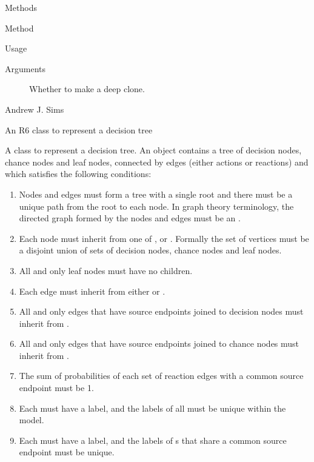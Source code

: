 \documentclass[a4paper]{book}
\begin{document}
\begin{Section}{Methods}
\begin{SubSection}{Method }
\begin{SubSubSection}{Usage}
\end{SubSubSection}


%
\begin{SubSubSection}{Arguments}

\begin{description}

\item[] Whether to make a deep clone.

\end{description}


\end{SubSubSection}

\end{SubSection}

\end{Section}
%
\begin{Author}\relax
Andrew J. Sims 
\end{Author}
%
\begin{Description}\relax
An R6 class to represent a decision tree
\end{Description}
%
\begin{Details}\relax
A class to represent a decision tree. An object contains a tree of
decision nodes, chance nodes and leaf nodes, connected by edges
(either actions or reactions) and which satisfies the following
conditions:
\begin{enumerate}

\item{} Nodes and edges must form a tree with a single root and
there must be a unique path from the root to each node.
In graph theory terminology, the directed graph formed by the nodes
and edges must be an .
\item{} Each node must inherit from one of ,
 or . Formally the set of vertices
must be a disjoint union of sets of decision nodes, chance nodes
and leaf nodes.
\item{} All and only leaf nodes must have no children.
\item{} Each edge must inherit from either  or
.
\item{} All and only edges that have source endpoints joined to 
decision nodes must inherit from .
\item{} All and only edges that have source endpoints joined to 
chance nodes must inherit from .
\item{} The sum of probabilities of each set of reaction edges 
with a common source endpoint must be 1.
\item{} Each  must have a label, and the labels of all
 must be unique within the model.
\item{} Each  must have a label, and the labels of  
s that share a common source endpoint must be unique.

\end{enumerate}

\end{Details}
\end{document}

